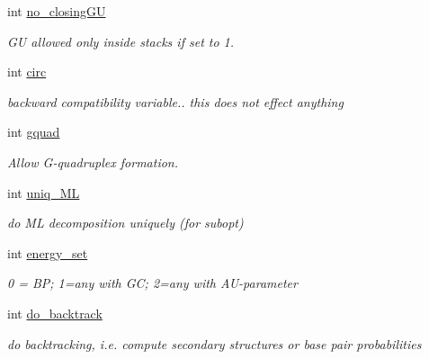 \begin{DoxyCompactItemize}
\mbox{\label{group__model__details_gaa8d1c7b92489179e1eafa562b7bdd259}} 
int \mbox{\hyperlink{group__model__details_gaa8d1c7b92489179e1eafa562b7bdd259}{no\+\_\+closing\+GU}}
\begin{DoxyCompactList}\small\item\em GU allowed only inside stacks if set to 1. \end{DoxyCompactList}\item 
\mbox{\label{group__model__details_gaf9202a1a09f5828dc731e2d9a10fa111}} 
int \mbox{\hyperlink{group__model__details_gaf9202a1a09f5828dc731e2d9a10fa111}{circ}}
\begin{DoxyCompactList}\small\item\em backward compatibility variable.. this does not effect anything \end{DoxyCompactList}\item 
\mbox{\label{group__model__details_ga25f2bdcdf56e813d288845484a13d704}} 
int \mbox{\hyperlink{group__model__details_ga25f2bdcdf56e813d288845484a13d704}{gquad}}
\begin{DoxyCompactList}\small\item\em Allow G-\/quadruplex formation. \end{DoxyCompactList}\item 
\mbox{\label{group__model__details_ga6c5655c8b272e3e6cab74dd0f540294f}} 
int \mbox{\hyperlink{group__model__details_ga6c5655c8b272e3e6cab74dd0f540294f}{uniq\+\_\+\+ML}}
\begin{DoxyCompactList}\small\item\em do ML decomposition uniquely (for subopt) \end{DoxyCompactList}\item 
int \mbox{\hyperlink{group__model__details_gafb1ef1166da85092ae8a325e02dcae71}{energy\+\_\+set}}
\begin{DoxyCompactList}\small\item\em 0 = BP; 1=any with GC; 2=any with A\+U-\/parameter \end{DoxyCompactList}\item 
int \mbox{\hyperlink{group__model__details_gad512b5dd4dbec60faccfe137bb474489}{do\+\_\+backtrack}}
\begin{DoxyCompactList}\small\item\em do backtracking, i.\+e. compute secondary structures or base pair probabilities \end{DoxyCompactList}\item 

\end{DoxyCompactItemize}
